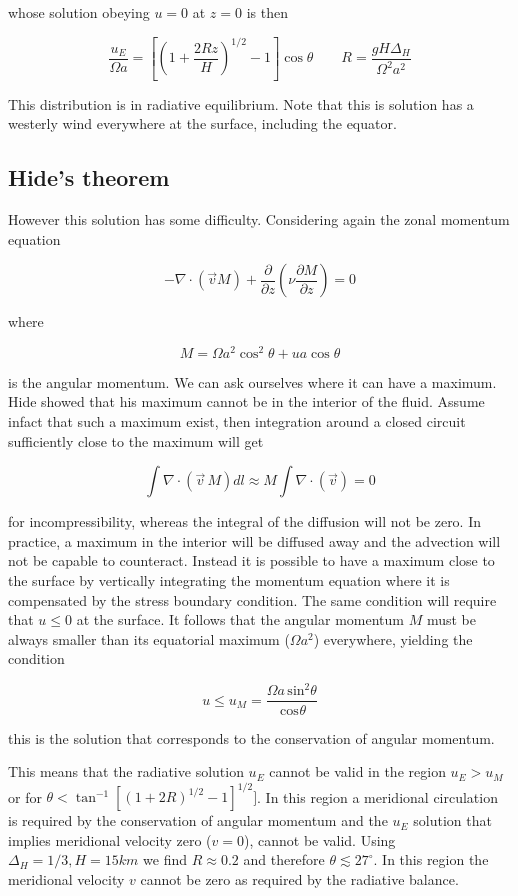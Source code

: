 whose solution obeying \(u=0\) at \(z=0\) is then

\[\frac{u_E}{\Omega a} = \left[\left( 1 + \frac{2 R z}{H}\right)^{1/2} - 1 \right]\cos\theta \qquad R = \frac{gH\Delta_H}{\Omega^2 a^2}\]

This distribution is in radiative equilibrium. Note that this is
solution has a westerly wind everywhere at the surface, including the
equator.

\subsection{Hide's theorem}

However this solution has some difficulty. Considering again the zonal
momentum equation

\[-\nabla\cdot(\vec{v} M) + \frac{\partial }{\partial z}\left(\nu\frac{\partial M}{\partial z}\right) = 0\]

where

\[M = \Omega a^2 \cos^2\theta + u a \cos\theta\]

is the angular momentum. We can ask ourselves where it can have a
maximum. Hide showed that his maximum cannot be in the interior of the
fluid. Assume infact that such a maximum exist, then integration around
a closed circuit sufficiently close to the maximum will get

\[\int\nabla\cdot(\vec{v}\, M) dl \approx M \int\nabla\cdot(\vec{v}) =0\]

for incompressibility, whereas the integral of the diffusion will not be
zero. In practice, a maximum in the interior will be diffused away and
the advection will not be capable to counteract. Instead it is possible
to have a maximum close to the surface by vertically integrating the
momentum equation where it is compensated by the stress boundary
condition. The same condition will require that \(u \leqslant 0\) at the
surface. It follows that the angular momentum \(M\) must be always
smaller than its equatorial maximum (\(\Omega a^2\)) everywhere,
yielding the condition

\[u \leqslant u_M = \frac{\Omega a \,\mathrm{sin}^{2} \theta}{\,\mathrm{cos}^{} \theta}\]

this is the solution that corresponds to the conservation of angular
momentum.

This means that the radiative solution \(u_E\) cannot be valid in the
region \(u_E > u_M\) or for
\(\theta < \tan^{-1} [(1+2R)^{1/2} -1]^{1/2}]\). In this region a
meridional circulation is required by the conservation of angular
momentum and the \(u_E\) solution that implies meridional velocity zero
(\(v=0\)), cannot be valid. Using \(\Delta_H = 1/3, H = 15km\) we find
\(R \approx 0.2\) and therefore \(\theta \lesssim 27^\circ\). In this
region the meridional velocity \(v\) cannot be zero as required by the
radiative balance.

